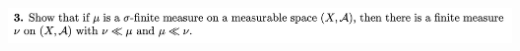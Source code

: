 














\newpage
\begin{mdframed}
\includegraphics[width=400pt]{img/analysis--berkeley-202a-hw11-3704.png}
\end{mdframed}

